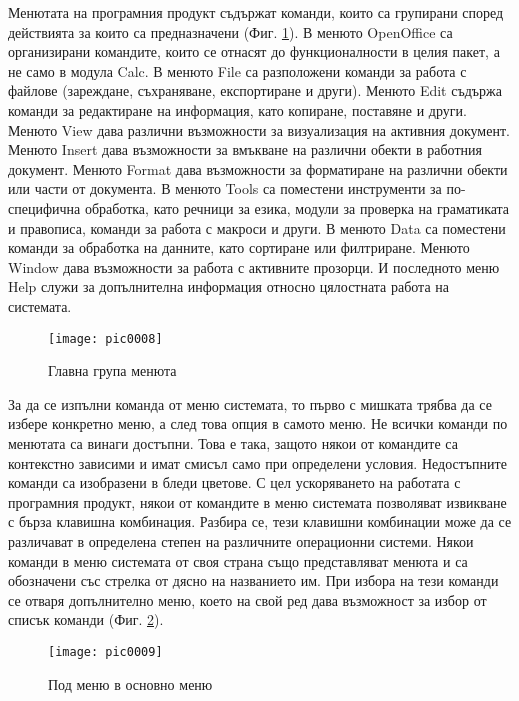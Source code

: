Менютата на програмния продукт съдържат команди, които са групирани според действията за които са предназначени (Фиг. \ref{figure0008}). В менюто OpenOffice са организирани командите, които се отнасят до функционалности в целия пакет, а не само в модула Calc. В менюто File са разположени команди за работа с файлове (зареждане, съхраняване, експортиране и други). Менюто Edit съдържа команди за редактиране на информация, като копиране, поставяне и други. Менюто View дава различни възможности за визуализация на активния документ. Менюто Insert дава възможности за вмъкване на различни обекти в работния документ. Менюто Format дава възможности за форматиране на различни обекти или части от документа. В менюто Tools са поместени инструменти за по-специфична обработка, като речници за езика, модули за проверка на граматиката и правописа, команди за работа с макроси и други. В менюто Data са поместени команди за обработка на данните, като сортиране или филтриране. Менюто Window дава възможности за работа с активните прозорци. И последното меню Help служи за допълнителна информация относно цялостната работа на системата. 

\begin{figure}[h!]
  \centering
  \texttt{[image: pic0008]}
  \caption{Главна група менюта}
\label{figure0008}
\end{figure}
\FloatBarrier

За да се изпълни команда от меню системата, то първо с мишката трябва да се избере конкретно меню, а след това опция в самото меню. Не всички команди по менютата са винаги достъпни. Това е така, защото някои от командите са контекстно зависими и имат смисъл само при определени условия. Недостъпните команди са изобразени в бледи цветове. С цел ускоряването на работата с програмния продукт, някои от командите в меню системата позволяват извикване с бърза клавишна комбинация. Разбира се, тези клавишни комбинации може да се различават в определена степен на различните операционни системи. Някои команди в меню системата от своя страна също представляват менюта и са обозначени със стрелка от дясно на названието им. При избора на тези команди се отваря допълнително меню, което на свой ред дава възможност за избор от списък команди (Фиг. \ref{figure0009}). 

\begin{figure}[h!]
  \centering
  \texttt{[image: pic0009]}
  \caption{Под меню в основно меню}
\label{figure0009}
\end{figure}
\FloatBarrier

